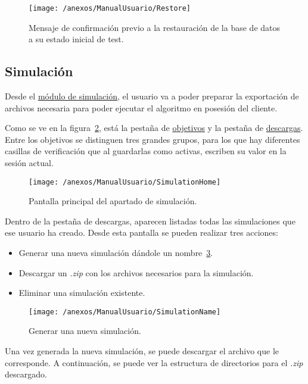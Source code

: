 \begin{figure}[h]
	\centering
	\texttt{[image: /anexos/ManualUsuario/Restore]}
	\caption{Mensaje de confirmación previo a la restauración de la base de datos a su estado inicial de test.}	\label{img:Restore}
\end{figure}

\newpage

\subsection{Simulación}

Desde el \href{https://www.proyectoubu.nesiweb.com/home/home-simulation}{módulo de simulación}, el usuario va a poder preparar la exportación de archivos necesaria para poder ejecutar el algoritmo en posesión del cliente.

Como se ve en la figura~\ref{img:SimulationHome}, está la pestaña de \href{https://www.proyectoubu.nesiweb.com/objectives/home}{objetivos} y la pestaña de \href{https://www.proyectoubu.nesiweb.com/simulations/home}{descargas}. Entre los objetivos se distinguen tres grandes grupos, para los que hay diferentes casillas de verificación que al guardarlas como activas, escriben su valor en la sesión actual.
\begin{figure}[h]
	\centering
	\texttt{[image: /anexos/ManualUsuario/SimulationHome]}
	\caption{Pantalla principal del apartado de simulación.}	
	\label{img:SimulationHome}
\end{figure}

Dentro de la pestaña de descargas, aparecen listadas todas las simulaciones que ese usuario ha creado. Desde esta pantalla se pueden realizar tres acciones:
\begin{itemize}
	\item Generar una nueva simulación dándole un nombre~\ref{img:SimulationName}.
	\item Descargar un \textit{.zip} con los archivos necesarios para la simulación.
	\item Eliminar una simulación existente.
\end{itemize}
\begin{figure}[h]
	\centering
	\texttt{[image: /anexos/ManualUsuario/SimulationName]}
	\caption{Generar una nueva simulación.}	
	\label{img:SimulationName}
\end{figure}

\newpage

Una vez generada la nueva simulación, se puede descargar el archivo que le corresponde. A continuación, se puede ver la estructura de directorios para el \textit{.zip} descargado.

